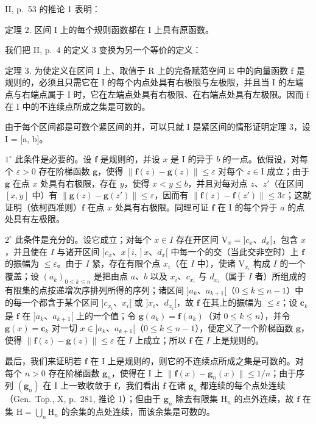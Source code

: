 II, p.~53 的推论 1 表明：

定理 2. 区间 I 上的每个规则函数都在 I 上具有原函数。

我们把 II, p.~4 的定义 3 变换为另一个等价的定义：

定理 3. 为使定义在区间 I 上、取值于 R 上的完备赋范空间 E 中的向量函数 f 是规则的，必须且只需它在 I 的每个内点处具有右极限与左极限，并且当 I 的左端点与右端点属于 I 时，它在左端点处具有右极限、在右端点处具有左极限。因而 f 在 I 中的不连续点所成之集是可数的。

由于每个区间都是可数个紧区间的并，可以只就 I 是紧区间的情形证明定理 3，设 I = {[}a, b{]}。

\(1^{\circ}\) 此条件是必要的。设 \(\mathbf{f}\) 是规则的，并设 \(x\) 是 I 的异于 \(b\) 的一点。依假设，对每个 \(\varepsilon > 0\) 存在阶梯函数 \(\mathbf{g}\)，使得 \(\| \mathbf{f}(z) - \mathbf{g}(z) \| \leqslant \varepsilon\) 对每个 \(z \in \mathrm{I}\) 成立；由于 \(\mathbf{g}\) 在点 \(x\) 处具有右极限，存在 \(y\)，使得 \(x < y \leqslant b\)，并且对每对点 \(z\)、\(z'\)（在区间 \([x, y]\) 中）有 \(\| \mathbf{g}(z) - \mathbf{g}(z') \| \leqslant \varepsilon\)，因而有 \(\| \mathbf{f}(z) - \mathbf{f}(z') \| \leqslant 3\varepsilon\)；这就证明（依柯西准则）\(\mathbf{f}\) 在点 \(x\) 处具有右极限。同理可证 \(\mathbf{f}\) 在 I 的每个异于 \(a\) 的点处具有左极限。

\(2^{\circ}\) 此条件是充分的。设它成立；对每个 \(x \in I\) 存在开区间 \(\mathrm{V}_x = ]c_x\)、\(d_x[\)，包含 \(x\)，并且使在 \(I\) 与诸开区间 \(]c_x\)、\(x[i, ]x\)、\(d_x[\) 中每一个的交（当此交非空时）上 \(\mathbf{f}\) 的振幅为 \(\leqslant \varepsilon\)。由于 \(I\) 紧，存在有限个点 \(x_i\)（在 \(I\) 中），使诸 \(\mathrm{V}_{x_i}\) 构成 \(I\) 的一个覆盖；设 \((a_k)_{0 \leqslant k \leqslant n}\) 是把由点 \(a\)、\(b\) 以及 \(x_i\)、\(c_{x_i}\) 与 \(d_{x_i}\)（属于 \(I\) 者）所组成的有限集的点按递增次序排列所得的序列；诸区间 \(]a_k\)、\(a_{k+1}[\)（\(0 \leqslant k \leqslant n-1\)）中的每一个都含于某个区间 \(]c_{x_i}\)、\(x_i[\) 或 \(]x_i\)、\(d_{x_i}[\)，故 \(\mathbf{f}\) 在其上的振幅为 \(\leqslant \varepsilon\)；设 \(\mathbf{c}_k\) 是 \(\mathbf{f}\) 在 \(]a_k\)、\(a_{k+1}[\) 上的一个值；令 \(\mathbf{g}(a_k) = \mathbf{f}(a_k)\)（对 \(0 \leqslant k \leqslant n\)），并令 \(\mathbf{g}(x) = \mathbf{c}_k\) 对一切 \(x \in ]a_k\)、\(a_{k+1}[\)（\(0 \leqslant k \leqslant n-1\)），便定义了一个阶梯函数 \(\mathbf{g}\)，使得 \(\| \mathbf{f}(z) - \mathbf{g}(z) \| \leqslant \varepsilon\) 在 \(I\) 上成立；所以 \(\mathbf{f}\) 在 \(I\) 上是规则的。

最后，我们来证明若 \(\mathbf{f}\) 在 I 上是规则的，则它的不连续点所成之集是可数的。对每个 \(n > 0\) 存在阶梯函数 \(\mathbf{g}_n\)，使得在 I 上 \(\| \mathbf{f}(x) - \mathbf{g}_n(x)\| \leqslant 1 / n\)；由于序列 \((\mathbf{g}_n)\) 在 I 上一致收敛于 \(\mathbf{f}\)，我们看出 \(\mathbf{f}\) 在诸 \(\mathbf{g}_n\) 都连续的每个点处连续（Gen.~Top., X, p.~281, 推论 1）；但由于 \(\mathbf{g}_n\) 除去有限集 \(\mathrm{H}_n\) 的点外连续，故 \(\mathbf{f}\) 在集 \(\mathrm{H} = \bigcup_{n}\mathrm{H}_{n}\) 的余集的点处连续，而该余集是可数的。

